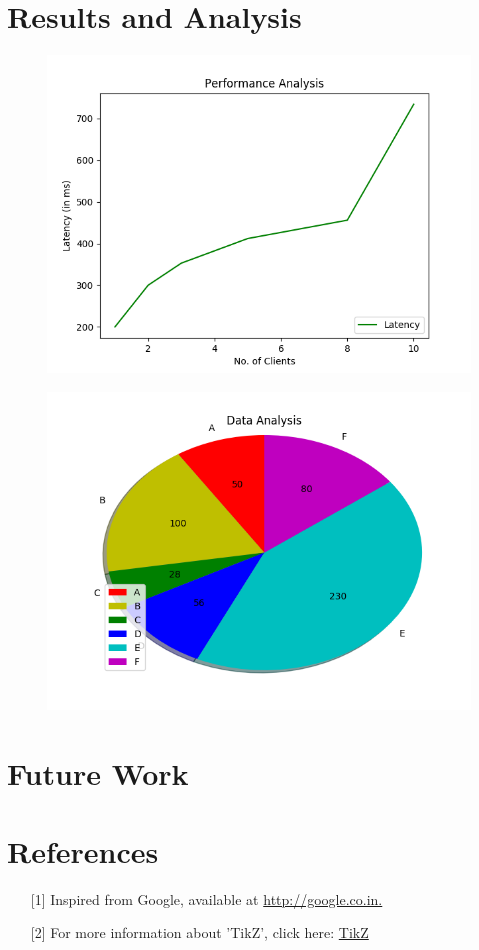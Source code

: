 \documentclass{article}
\begin{document}
\section{Results and Analysis}
\begin{figure}[ht]
\graphicspath{ {/home/} }
\includegraphics{PerformanceAnalysis}
\end{figure}
\begin{figure}[h]
\graphicspath{ {/home/} }
\includegraphics{DataAnalysis}

\end{figure}




\section{Future Work}


\section*{References}
\begin{enumerate}%
\item [][1] Inspired from Google, available at \href{http://google.co.in}{\color{blue}http://google.co.in.}
\item [][2] For more information about ’TikZ’, click here: \href {https://tex.stackexchange.com/?tags=tikz-pgf}{\color{blue}TikZ}
\end{enumerate}
\end{document}
